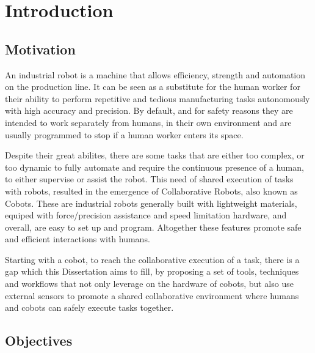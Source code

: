 \chapter{Introduction}
\label{chapter:introduction}





\section{Motivation}

\par An industrial robot is a machine that allows efficiency, strength and automation on the production line. It can be seen as a substitute for the human worker for their ability to perform repetitive and tedious manufacturing tasks autonomously with high accuracy and precision. By default, and for safety reasons they are intended to work separately from humans, in their own environment and are usually programmed to stop if a human worker enters its space.

\par Despite their great abilites, there are some tasks that are either too complex, or too dynamic to fully automate and require the continuous presence of a human, to either supervise or assist the robot. This need of shared execution of tasks with robots, resulted in the emergence of Collaborative Robots, also known as Cobots. These are industrial robots generally built with lightweight materials, equiped with force/precision assistance and speed limitation hardware, and overall, are easy to set up and program. Altogether these features promote safe and efficient interactions with humans.

\par Starting with a cobot, to reach the collaborative execution of a task, there is a gap which this Dissertation aims to fill, by proposing a set of tools, techniques and workflows that not only leverage on the hardware of cobots, but also use external sensors to promote a shared collaborative environment where humans and cobots can safely execute tasks together.



\section{Objectives}

